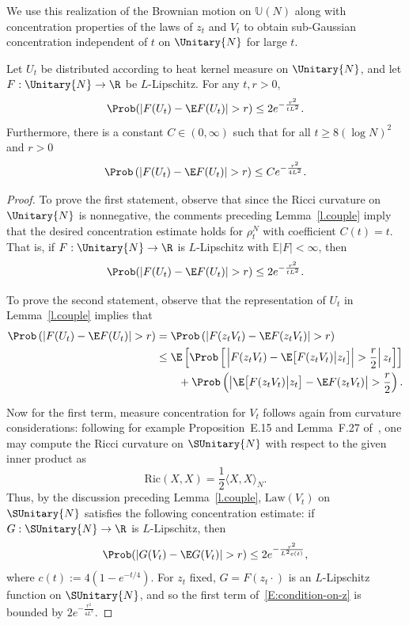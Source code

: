 We use this realization of the Brownian motion on $\mathbb{U}(N)$ along with concentration properties of the laws of $z_t$ and $V_t$ to obtain sub-Gaussian concentration independent of $t$ on $\Unitary{N}$ for large $t$.

\begin{prop}\label{T:BM-U(N)-concentration}
Let $U_t$ be distributed according to heat kernel measure on $\Unitary{N}$, and let $F:\Unitary{N}\to\R$ be $L$-Lipschitz. For any $t,r>0$,
\[
\Prob(|F(U_t)-\E F(U_t)|>r)\le 2e^{-\frac{r^2}{tL^2}}.
\]
Furthermore, there is a constant $C\in(0,\infty)$ such that for all $t\ge8(\log N)^2$ and $r>0$
\[
\Prob\left(|F(U_t)-\E F(U_t)|>r\right)\le C e^{-\frac{r^2}{4L^2}}.
\]
\end{prop}

\begin{proof}
To prove the first statement, observe that since the Ricci curvature on $\Unitary{N}$ is nonnegative, the comments preceding Lemma~\ref{l.couple} imply that the desired concentration estimate holds for $\rho_t^N$ with coefficient $C(t)=t$. That is, if $F:\Unitary{N}\to\R$ is $L$-Lipschitz with $\mathbb{E}|F|<\infty$, then
\[
\Prob(|F(U_t)-\E F(U_t)|>r)\le 2e^{-\frac{r^2}{tL^2}}.
\]

To prove the second statement, observe that the representation of $U_t$ in Lemma~\ref{l.couple} implies that
\begin{equation}
\begin{split}\label{E:condition-on-z}
\Prob\left(|F(U_t)-\E F(U_t)|>r\right) &=\Prob\left(|F(z_tV_t)-\E F(z_tV_t)|>r\right)\\
&\le\E\left[\Prob\left[\left.\Big|F(z_tV_t)-\E\big[F(z_tV_t)\big|z_t\big]\Big|>\frac{r}{2}\right|z_t\right]\right] \\
&\qquad +\Prob\left(\left|\E\big[F(z_tV_t)\big|z_t\big]-\E F(z_tV_t)\right|>\frac{r}{2}\right).
\end{split}
\end{equation}

Now for the first term, measure concentration for $V_t$ follows again from curvature considerations: following for example Proposition~E.15 and Lemma~F.27 of~\cite{AGZ}, one may compute the Ricci curvature on $\SUnitary{N}$ with respect to the given inner product as
\[
\mathrm{Ric}(X,X) = \frac{1}{2}\langle X,X\rangle_N.
\]
Thus, by the discussion preceding Lemma~\ref{l.couple}, $\mathrm{Law}(V_t)$ on $\SUnitary{N}$ satisfies the following concentration estimate: if $G:\SUnitary{N}\to\R$ is $L$-Lipschitz, then
\[
\Prob(|G(V_t)-\E G(V_t)|>r)\le 2e^{-\frac{r^2}{L^2c(t)}},
\]
where $c(t):=4(1-e^{-t/4})$. For $z_t$ fixed, $G=F(z_t\cdot)$ is an $L$-Lipschitz function on $\SUnitary{N}$, and so the first term of~\eqref{E:condition-on-z} is bounded by $2e^{-\frac{r^2}{4L^2}}$.


\end{proof}

